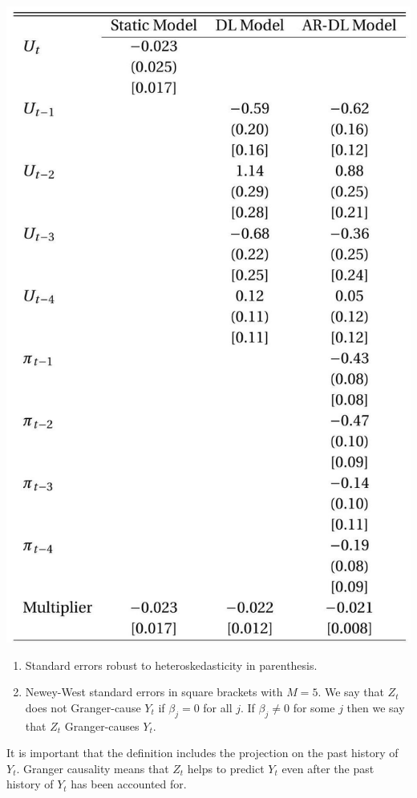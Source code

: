 \documentclass[10pt]{article}
\begin{document}
\includegraphics[max width=\textwidth]{2022_10_23_6047885e7d154c9f28afg-52}

\begin{enumerate}
  \item Standard errors robust to heteroskedasticity in parenthesis.

  \item Newey-West standard errors in square brackets with $M=5$. We say that $Z_{t}$ does not Granger-cause $Y_{t}$ if $\beta_{j}=0$ for all $j$. If $\beta_{j} \neq 0$ for some $j$ then we say that $Z_{t}$ Granger-causes $Y_{t}$.

\end{enumerate}
It is important that the definition includes the projection on the past history of $Y_{t}$. Granger causality means that $Z_{t}$ helps to predict $Y_{t}$ even after the past history of $Y_{t}$ has been accounted for.
\end{document}
